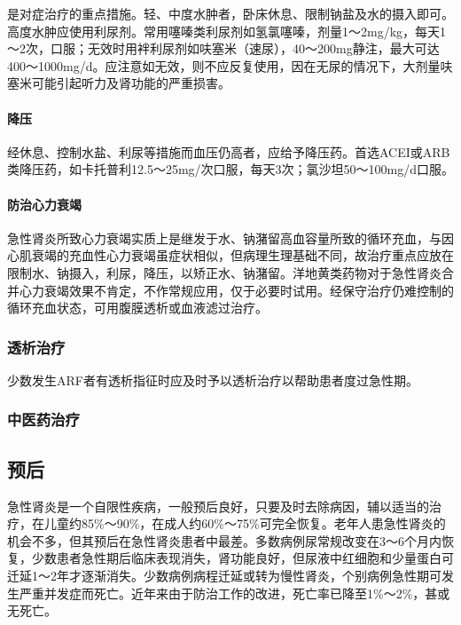是对症治疗的重点措施。轻、中度水肿者，卧床休息、限制钠盐及水的摄入即可。高度水肿应使用利尿剂。常用噻嗪类利尿剂如氢氯噻嗪，剂量1～2mg/kg，每天1～2次，口服；无效时用袢利尿剂如呋塞米（速尿），40～200mg静注，最大可达400～1000mg/d。应注意如无效，则不应反复使用，因在无尿的情况下，大剂量呋塞米可能引起听力及肾功能的严重损害。

\paragraph{降压}

经休息、控制水盐、利尿等措施而血压仍高者，应给予降压药。首选ACEI或ARB类降压药，如卡托普利12.5～25mg/次口服，每天3次；氯沙坦50～100mg/d口服。

\paragraph{防治心力衰竭}

急性肾炎所致心力衰竭实质上是继发于水、钠潴留高血容量所致的循环充血，与因心肌衰竭的充血性心力衰竭虽症状相似，但病理生理基础不同，故治疗重点应放在限制水、钠摄入，利尿，降压，以矫正水、钠潴留。洋地黄类药物对于急性肾炎合并心力衰竭效果不肯定，不作常规应用，仅于必要时试用。经保守治疗仍难控制的循环充血状态，可用腹膜透析或血液滤过治疗。

\subsubsection{透析治疗}

少数发生ARF者有透析指征时应及时予以透析治疗以帮助患者度过急性期。

\subsubsection{中医药治疗}

\subsection{预后}

急性肾炎是一个自限性疾病，一般预后良好，只要及时去除病因，辅以适当的治疗，在儿童约85\%～90\%，在成人约60\%～75\%可完全恢复。老年人患急性肾炎的机会不多，但其预后在急性肾炎患者中最差。多数病例尿常规改变在3～6个月内恢复，少数患者急性期后临床表现消失，肾功能良好，但尿液中红细胞和少量蛋白可迁延1～2年才逐渐消失。少数病例病程迁延或转为慢性肾炎，个别病例急性期可发生严重并发症而死亡。近年来由于防治工作的改进，死亡率已降至1\%～2\%，甚或无死亡。

